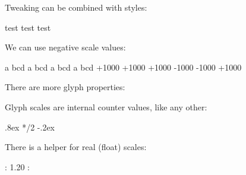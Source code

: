 \typebuffer

\startlinecorrection
\getbuffer
\stoplinecorrection

\page

Tweaking can be combined with styles:

\startbuffer
{}
test {\MyLargerFontA test} test
\stopbuffer

\typebuffer

\getbuffer

\page

We can use negative scale values:

\startbuffer
\bTABLE[align=middle]
  \bTR
    \bTD a{  bc}d \eTD
    \bTD a{  bc}d \eTD
    \bTD a{  bc}d \eTD
    \bTD a{  bc}d \eTD
  \eTR
  \bTR
    \bTD \tttf +1000 +1000 \eTD
    \bTD \tttf +1000 -1000 \eTD
    \bTD {} -1000 \eTD
    \bTD {} +1000 \eTD
  \eTR
\eTABLE
\stopbuffer

\typebuffer

\startlinecorrection
\getbuffer
\stoplinecorrection

\page

There are more glyph properties:

\startbuffer
{}
\stopbuffer

\typebuffer \scale[width=\textwidth]{\getbuffer}

\page

Glyph scales are internal counter values, like any other:

\startbuffer
{}
{\glyphyoffset .8ex
  \glyphyscale\glyphxscale
 }
{\glyphyscale{}*\glyphxscale/2\relax
 }
{\glyphyoffset -.2ex
  \glyphyscale\glyphxscale
 }
\stopbuffer

\typebuffer

\getbuffer

\page

There is a helper for real (float) scales:

 : \the{}
1.20 : \the{}
\stopbuffer

